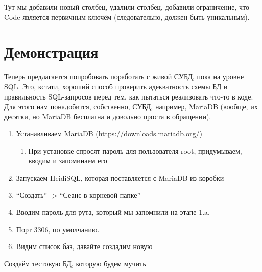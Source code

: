 \documentclass{../../text-style}
\begin{document}
Тут мы добавили новый столбец, удалили столбец, добавили ограничение, что Code является первичным ключём (следовательно, должен быть уникальным).

\section{Демонстрация}

Теперь предлагается попробовать поработать с живой СУБД, пока на уровне SQL. Это, кстати, хороший способ проверить адекватность схемы БД и правильность SQL-запросов перед тем, как пытаться реализовать что-то в коде. Для этого нам понадобится, собственно, СУБД, например, MariaDB (вообще, их десятки, но MariaDB бесплатна и довольно проста в обращении).

\begin{enumerate}
    \item Устанавливаем MariaDB (\url{https://downloads.mariadb.org/})
    \begin{enumerate}
        \item При установке спросят пароль для пользователя root, придумываем, вводим и запоминаем его
    \end{enumerate}
    \item Запускаем HeidiSQL, которая поставляется с MariaDB из коробки
    \item ``Создать'' -> ``Сеанс в корневой папке''
    \item Вводим пароль для рута, который мы запомнили на этапе 1.a.
    \item Порт 3306, по умолчанию.
    \item Видим список баз, давайте создадим новую
\end{enumerate}

Создаём тестовую БД, которую будем мучить
\end{document}
